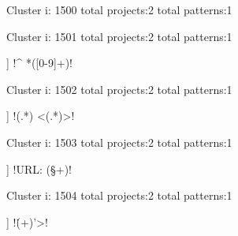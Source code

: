Cluster i: 1500
total projects:2
total patterns:1
\begin{multicols}{1}
\end{multicols}







Cluster i: 1501
total projects:2
total patterns:1
\begin{multicols}{1}
\begin{description}[noitemsep,topsep=0pt]
\item [[2] ] \cverb!^ *([0-9]+)!
\end{description}
\end{multicols}







Cluster i: 1502
total projects:2
total patterns:1
\begin{multicols}{1}
\begin{description}[noitemsep,topsep=0pt]
\item [[2] ] \cverb!(.*) <(.*)>!
\end{description}
\end{multicols}







Cluster i: 1503
total projects:2
total patterns:1
\begin{multicols}{1}
\begin{description}[noitemsep,topsep=0pt]
\item [[2] ] \cverb!URL: (\S+)!
\end{description}
\end{multicols}







Cluster i: 1504
total projects:2
total patterns:1
\begin{multicols}{1}
\begin{description}[noitemsep,topsep=0pt]
\item [[2] ] \cverb!\.(\w+)'>!
\end{description}
\end{multicols}







